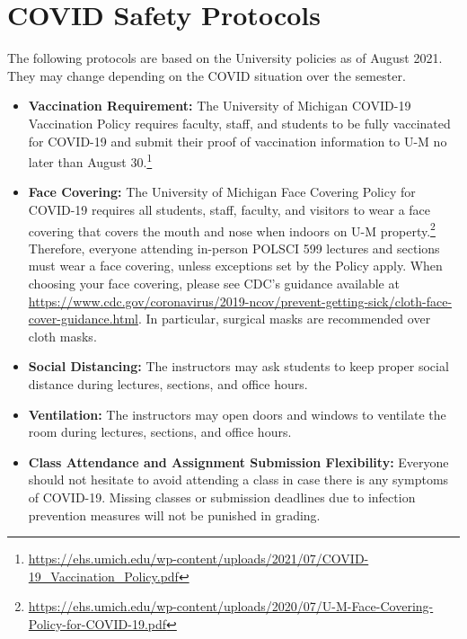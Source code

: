 \documentclass[11pt]{article}
\begin{document}
\section{COVID Safety Protocols}
The following protocols are based on the University policies as of August 2021. They may change depending on the COVID situation over the semester.
\begin{itemize}
 \item \textbf{Vaccination Requirement:} The University of Michigan COVID-19 Vaccination Policy requires faculty, staff, and students to be fully vaccinated for COVID-19 and submit their proof of vaccination information to U-M no later than August 30.\footnote{\url{https://ehs.umich.edu/wp-content/uploads/2021/07/COVID-19_Vaccination_Policy.pdf}}
 \item \textbf{Face Covering:} The University of Michigan Face Covering Policy for COVID-19 requires all students, staff, faculty, and visitors to wear a face covering that covers the mouth and nose when indoors on U-M property.\footnote{\url{https://ehs.umich.edu/wp-content/uploads/2020/07/U-M-Face-Covering-Policy-for-COVID-19.pdf}}
       Therefore, everyone attending in-person POLSCI 599 lectures and sections must wear a face covering, unless exceptions set by the Policy apply.
       When choosing your face covering, please see CDC's guidance available at \url{https://www.cdc.gov/coronavirus/2019-ncov/prevent-getting-sick/cloth-face-cover-guidance.html}.
       In particular, surgical masks are recommended over cloth masks.
 \item \textbf{Social Distancing:} The instructors may ask students to keep proper social distance during lectures, sections, and office hours.
 \item \textbf{Ventilation:} The instructors may open doors and windows to ventilate the room during lectures, sections, and office hours.
 \item \textbf{Class Attendance and Assignment Submission Flexibility:} Everyone should not hesitate to avoid attending a class in case there is any symptoms of COVID-19. Missing classes or submission deadlines due to infection prevention measures will not be punished in grading.
\end{itemize}
\end{document}
